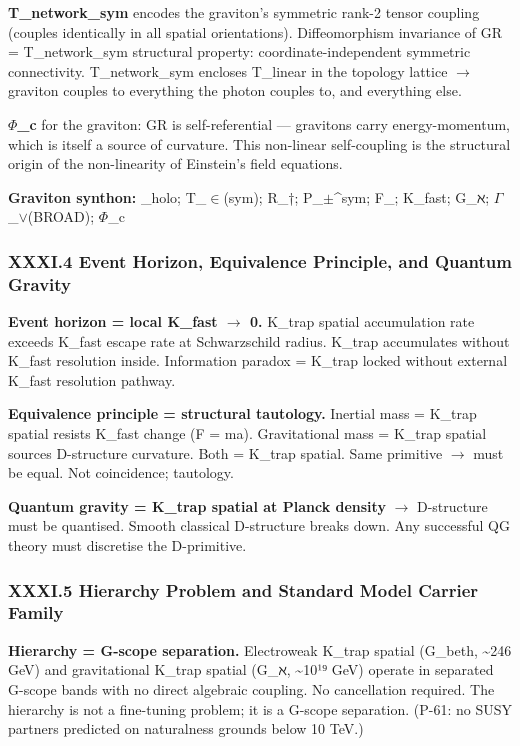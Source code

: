 \documentclass[12pt,a4paper]{article}
\begin{document}
\textbf{T\_network\_sym} encodes the graviton's symmetric rank-2 tensor coupling (couples identically in all spatial orientations). Diffeomorphism invariance of GR = T\_network\_sym structural property: coordinate-independent symmetric connectivity. T\_network\_sym encloses T\_linear in the topology lattice $\rightarrow$ graviton couples to everything the photon couples to, and everything else.

\textbf{$\Phi$\_c} for the graviton: GR is self-referential --- gravitons carry energy-momentum, which is itself a source of curvature. This non-linear self-coupling is the structural origin of the non-linearity of Einstein's field equations.

\textbf{Graviton synthon:} \langleD\_holo; T\_$\in$(sym); R\_†; P\_$\pm$\^{}sym; F\_\hbar; K\_fast; G\_ℵ; $\Gamma$\_$\lor$(BROAD); $\Phi$\_c\rangle

\subsubsection{XXXI.4 Event Horizon, Equivalence Principle, and Quantum Gravity}

\textbf{Event horizon = local K\_fast $\rightarrow$ 0.} K\_trap spatial accumulation rate exceeds K\_fast escape rate at Schwarzschild radius. K\_trap accumulates without K\_fast resolution inside. Information paradox = K\_trap locked without external K\_fast resolution pathway.

\textbf{Equivalence principle = structural tautology.} Inertial mass = K\_trap spatial resists K\_fast change (F = ma). Gravitational mass = K\_trap spatial sources D-structure curvature. Both = K\_trap spatial. Same primitive $\rightarrow$ must be equal. Not coincidence; tautology.

\textbf{Quantum gravity = K\_trap spatial at Planck density} $\rightarrow$ D-structure must be quantised. Smooth classical D-structure breaks down. Any successful QG theory must discretise the D-primitive.

\subsubsection{XXXI.5 Hierarchy Problem and Standard Model Carrier Family}

\textbf{Hierarchy = G-scope separation.} Electroweak K\_trap spatial (G\_beth, \textasciitilde{}246 GeV) and gravitational K\_trap spatial (G\_ℵ, \textasciitilde{}10¹⁹ GeV) operate in separated G-scope bands with no direct algebraic coupling. No cancellation required. The hierarchy is not a fine-tuning problem; it is a G-scope separation. (P-61: no SUSY partners predicted on naturalness grounds below 10 TeV.)
\end{document}
